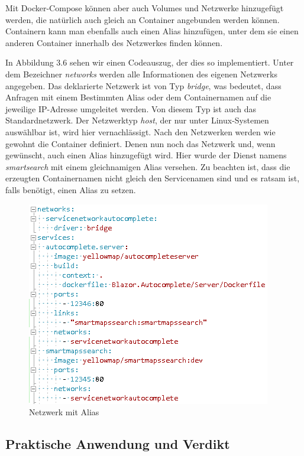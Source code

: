 \documentclass[12pt,a4paper]{scrartcl}
\begin{document}
Mit Docker-Compose können aber auch Volumes und Netzwerke hinzugefügt werden, die natürlich auch gleich an Container angebunden werden können.
Containern kann man ebenfalls auch einen Alias hinzufügen, unter dem sie einen anderen Container innerhalb des Netzwerkes finden können. 

In Abbildung 3.6 sehen wir einen Codeauszug, der dies so implementiert. Unter dem Bezeichner \emph{networks} werden alle Informationen des eigenen Netzwerks angegeben. Das deklarierte Netzwerk ist von Typ \emph{bridge}, was bedeutet, dass Anfragen mit einem Bestimmten Alias oder dem Containernamen auf die jeweilige IP-Adresse umgeleitet werden. Von diesem Typ ist auch das Standardnetzwerk. Der Netzwerktyp \emph{host}, der nur unter Linux-Systemen auswählbar ist, wird hier vernachlässigt. Nach den Netzwerken werden wie gewohnt die Container definiert. Denen nun noch das Netzwerk und, wenn gewünscht, auch einen Alias hinzugefügt wird. Hier wurde der Dienst namens \emph{smartsearch} mit einem gleichnamigen Alias versehen. Zu beachten ist, dass die erzeugten Containernamen nicht gleich den Servicenamen sind und es ratsam ist, falls benötigt, einen Alias zu setzen.

\begin{figure}[h!]
	\centering
	\includegraphics[scale=1]{DockerComposeNetwork.png}
	\caption[Screenshot]{Netzwerk mit Alias}
\end{figure}

\subsection{Praktische Anwendung und Verdikt}
\end{document}
